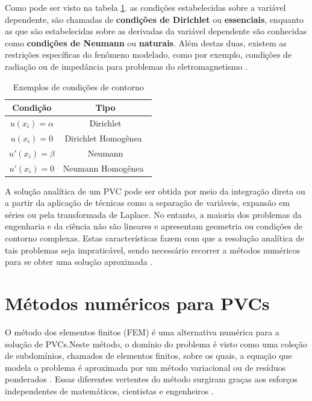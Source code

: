 \documentclass[
    12pt,               %
    openright,          %
    oneside,
    a4paper,            %
    english,            %
    french,             %
    spanish,            %
    brazil              %
    ]{abntex2}
\begin{document}
Como pode ser visto na tabela \ref{tab:cond}. as condições estabelecidas sobre a variável dependente, são chamadas de \textbf{condições de Dirichlet} ou \textbf{essenciais}, enquanto as que são estabelecidas sobre as derivadas da variável dependente são  conhecidas como \textbf{condições de Neumann} ou  \textbf{naturais}. Além destas duas, existem as restrições específicas do fenômeno modelado, como por exemplo, condições de radiação ou de impedância para problemas do eletromagnetismo \cite{jin}. 


\begin{table}   
	\centering
	\begin{tabular}{|c|c|}  
		\hline
		\textbf{Condição} 
		& \textbf{Tipo} \\  
		\hline
		$u(x_i) = \alpha $ 
		& Dirichlet \\
		\hline
		$u(x_i) = 0$
		& Dirichlet Homogênea\  \\
		\hline
		$u'(x_i) = \beta$
		& Neumann \\
		\hline
		$u'(x_i) = 0$
		& Neumann Homogênea\  \\
		\hline
	\end{tabular}
	\caption{Exemplos de condições de contorno}
	\label{tab:cond}
\end{table}


A solução analítica de um PVC pode ser obtida por meio da integração direta ou a partir da aplicação de técnicas como a separação de variáveis, expansão em séries ou pela transformada de Laplace.
No entanto, a maioria dos problemas da engenharia e da ciência não são lineares e apresentam geometria ou condições de contorno complexas.  Estas características fazem com que a resolução analítica de tais problemas seja impraticável, sendo necessário recorrer a métodos numéricos para se obter uma solução aproximada \cite{boyceDiprima, powers}.



\section{Métodos numéricos para PVCs}
\label{sec:FEM}

O método dos elementos finitos (FEM) é uma alternativa numérica para a solução de PVCs.Neste método, o domínio do problema é visto como uma coleção de subdomínios, chamados de elementos finitos, sobre os quais, a equação que modela o problema é aproximada por um método variacional ou de resíduos ponderados . Essas diferentes vertentes do método surgiram graças aos esforços independentes de matemáticos, cientistas e engenheiros \cite{zien}. 
\end{document}
